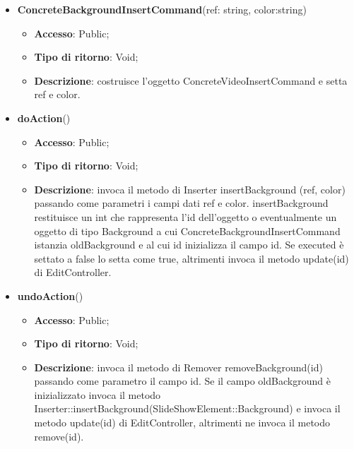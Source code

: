 {{{	
	\begin{itemize}
		\item \textbf{ConcreteBackgroundInsertCommand}(ref: string, color:string)
		\begin{itemize}
			\item \textbf{Accesso}: Public;
			\item \textbf{Tipo di ritorno}: Void;
			\item \textbf{Descrizione}: costruisce l’oggetto ConcreteVideoInsertCommand e setta ref e color.
		\end{itemize}
		\item \textbf{doAction}()
		\begin{itemize}
			\item \textbf{Accesso}: Public;
			\item \textbf{Tipo di ritorno}: Void;
			\item \textbf{Descrizione}: invoca il metodo di Inserter insertBackground (ref, color) passando come parametri i  campi dati ref e color. insertBackground restituisce un int che rappresenta l’id dell’oggetto o eventualmente un oggetto di tipo Background a cui ConcreteBackgroundInsertCommand istanzia oldBackground e al cui id inizializza il campo id. Se executed è settato a false lo setta come true, altrimenti invoca il metodo update(id) di EditController.
		\end{itemize}
		\item \textbf{undoAction}()
		\begin{itemize}
			\item \textbf{Accesso}: Public;
			\item \textbf{Tipo di ritorno}: Void;
			\item \textbf{Descrizione}: invoca il metodo di Remover removeBackground(id) passando come parametro il campo id. Se il campo oldBackground è inizializzato invoca il metodo Inserter::insertBackground(SlideShowElement::Background) e invoca il metodo update(id) di EditController, altrimenti ne invoca il metodo remove(id).
		\end{itemize}
	\end{itemize}
	}
}}
